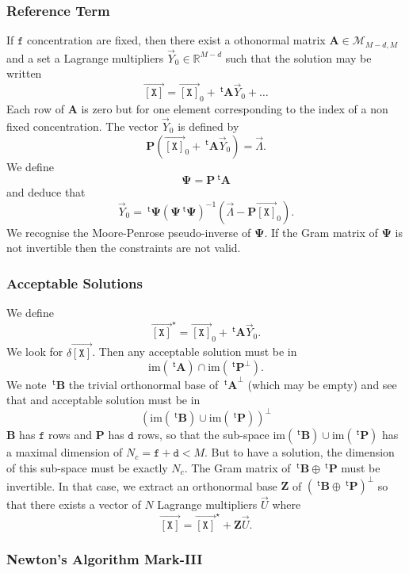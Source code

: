 \documentclass[aps,twocolumn]{revtex4}
\newcommand{\myconc}[1]{\left\lbrack #1 \right\rbrack}
\newcommand{\mychem}[1]{{\mathtt{#1}}}
\newcommand{\mymat}[1]{\boldsymbol{#1}}
\newcommand{\mytrn}[1]{{\!\!~^{\mathsf{t}}{#1}}}
\newcommand{\myvec}[1]{\overrightarrow{#1}}
\newcommand{\vecX}{\myvec{\myconc{\mychem{X}}}}
\newcommand{\dof}{\mathtt{d}}
\newcommand{\fixed}{\mathtt{f}}
\begin{document}
\subsubsection{Reference Term}
If $\fixed$ concentration are fixed, then there exist a othonormal matrix $\mymat{A}\in\mathcal{M}_{M-d,M}$ and
a set a Lagrange multipliers $\vec{Y}_0\in\mathbb{R}^{M-d}$ such that the solution may be written
\begin{equation}
	\vecX = \vecX_0 + \mytrn{\mymat{A}}\vec{Y}_0 + \ldots
\end{equation}
Each row of $\mymat{A}$ is zero but for one element corresponding to the index of a non fixed concentration.
The vector $\vec{Y}_0$ is defined by
$$
	\mymat{P}\left(\vecX_0+\mytrn{\mymat{A}}\vec{Y}_0\right) = \vec\Lambda.
$$
We define
$$
	\mymat{\Psi} = \mymat{P}\mytrn{\mymat{A}}
$$
and deduce that
$$
	\vec{Y}_0 = \mytrn{\mymat{\Psi}} \left(\mymat{\Psi} \mytrn{\mymat{\Psi}}\right)^{-1}\left( \vec{\Lambda} - \mymat{P}\vecX_0\right).
$$
We recognise the Moore-Penrose pseudo-inverse of $\mymat{\Psi}$. If the Gram matrix of $\mymat{\Psi}$ is not invertible then
the constraints are not valid.

\subsubsection{Acceptable Solutions}
We define
$$
	\vecX^\star = \vecX_0 + \mytrn{\mymat{A}}\vec{Y}_0.
$$
We look for $\delta\vecX$.
Then any acceptable solution must be in
$$
	\mathrm{im}(\mytrn{\mymat{A}}) \cap \mathrm{im}(\mytrn{\mymat{P}^\perp}).
$$
We note $\mytrn{\mymat{B}}$ the trivial orthonormal base of  $\mytrn{\mymat{A}}^\perp$ (which may be empty)
and see that and acceptable solution must be in
$$
	\left( 
	\mathrm{im}(\mytrn{\mymat{B}})
	\cup
	\mathrm{im}(\mytrn{\mymat{P}})
	\right)^\perp
$$
$\mymat{B}$ has $\fixed$ rows and $\mymat{P}$ has $\dof$ rows, so that the sub-space $\mathrm{im}(\mytrn{\mymat{B}})
	\cup
	\mathrm{im}(\mytrn{\mymat{P}})$
	has a maximal dimension of $N_c=\fixed+\dof<M$.
But to have a solution, the dimension of this sub-space must be exactly $N_c$.
The Gram matrix of $\mytrn{\mymat{B}} \oplus \mytrn{\mymat{P}}$ must be invertible.
In that case, we extract an orthonormal base $\mymat{Z}$ of  $(\mytrn{\mymat{B}} \oplus \mytrn{\mymat{P}})^\perp$
so that there exists a vector of $N$ Lagrange multipliers $\vec{U}$ where
$$
	\vecX = \vecX^\star + \mymat{Z}\vec{U}.
$$

\subsubsection{Newton's Algorithm Mark-III}
\end{document}
